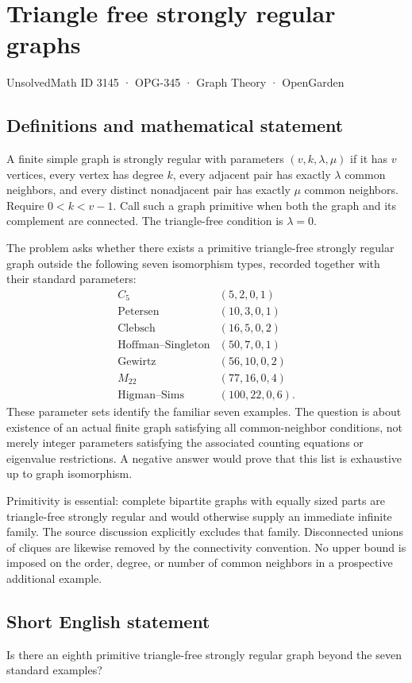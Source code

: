 \documentclass[11pt,a4paper]{article}
\begin{document}
\section*{Triangle free strongly regular graphs}\label{3145}
{\small UnsolvedMath ID 3145 · OPG-345 · Graph Theory · OpenGarden}
\subsection{Definitions and mathematical statement}
A finite simple graph is strongly regular with parameters $(v,k,\lambda,\mu)$ if it has $v$ vertices, every vertex has degree $k$, every adjacent pair has exactly $\lambda$ common neighbors, and every distinct nonadjacent pair has exactly $\mu$ common neighbors. Require $0<k<v-1$. Call such a graph primitive when both the graph and its complement are connected. The triangle-free condition is $\lambda=0$.

The problem asks whether there exists a primitive triangle-free strongly regular graph outside the following seven isomorphism types, recorded together with their standard parameters:
\[
\begin{array}{c|c}
 C_5&(5,2,0,1)\\
 \text{Petersen}&(10,3,0,1)\\
 \text{Clebsch}&(16,5,0,2)\\
 \text{Hoffman--Singleton}&(50,7,0,1)\\
 \text{Gewirtz}&(56,10,0,2)\\
 M_{22}&(77,16,0,4)\\
 \text{Higman--Sims}&(100,22,0,6).
\end{array}
\]
These parameter sets identify the familiar seven examples. The question is about existence of an actual finite graph satisfying all common-neighbor conditions, not merely integer parameters satisfying the associated counting equations or eigenvalue restrictions. A negative answer would prove that this list is exhaustive up to graph isomorphism.

Primitivity is essential: complete bipartite graphs with equally sized parts are triangle-free strongly regular and would otherwise supply an immediate infinite family. The source discussion explicitly excludes that family. Disconnected unions of cliques are likewise removed by the connectivity convention. No upper bound is imposed on the order, degree, or number of common neighbors in a prospective additional example.
\subsection{Short English statement}
Is there an eighth primitive triangle-free strongly regular graph beyond the seven standard examples?
\end{document}
